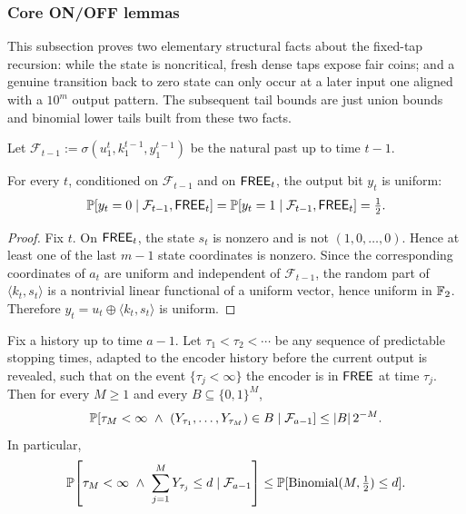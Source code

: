 \subsubsection{Core ON/OFF lemmas}
\label{subsec:inner-dense-onoff}

This subsection proves two elementary structural facts about the fixed-tap
recursion: while the state is noncritical, fresh dense taps expose fair coins;
and a genuine transition back to zero state can only occur at a later input one
aligned with a \(10^m\) output pattern.  The subsequent tail bounds are just
union bounds and binomial lower tails built from these two facts.

Let $\mathcal{F}_{t-1}:=\sigma(u_1^t,k_1^{t-1},y_1^{t-1})$ be the natural past up to time $t-1$.

\begin{lemma}
\label{lem:dense-fair-while-on}
For every $t$, conditioned on $\mathcal{F}_{t-1}$ and on $\mathsf{FREE}_t$, the output bit $y_t$ is uniform:
\[
\mathbb{P}[y_t=0\mid \mathcal{F}_{t-1},\mathsf{FREE}_t]=\mathbb{P}[y_t=1\mid \mathcal{F}_{t-1},\mathsf{FREE}_t]=\tfrac12.
\]
\end{lemma}

\begin{proof}
Fix $t$. On $\mathsf{FREE}_t$, the state \(s_t\) is nonzero and is not \((1,0,\dots,0)\). Hence at least one of the last
\(m-1\) state coordinates is nonzero. Since the corresponding coordinates of \(a_t\) are uniform and independent of
\(\mathcal{F}_{t-1}\), the random part of \(\langle k_t,s_t\rangle\) is a nontrivial linear functional of a uniform
vector, hence uniform in \(\mathbb{F}_2\). Therefore \(y_t=u_t\oplus\langle k_t,s_t\rangle\) is uniform.
\end{proof}

\begin{lemma}
\label{lem:dense-on-time-domination}
Fix a history up to time \(a-1\). Let
\(\tau_1<\tau_2<\cdots\) be any sequence of predictable stopping times, adapted to the encoder history before the
current output is revealed, such that on the event \(\{\tau_j<\infty\}\) the encoder is in \(\mathsf{FREE}\) at time
\(\tau_j\). Then
for every \(M\ge 1\) and every \(B\subseteq\{0,1\}^M\),
\[
\mathbb{P}\!\left[
\tau_M<\infty\ \wedge\ (Y_{\tau_1},\dots,Y_{\tau_M})\in B
\mid \mathcal{F}_{a-1}
\right]
\le
|B|\,2^{-M}.
\]
In particular,
\[
\mathbb{P}\!\left[
\tau_M<\infty\ \wedge\ \sum_{j=1}^M Y_{\tau_j}\le d
\mid \mathcal{F}_{a-1}
\right]
\le
\mathbb{P}[\operatorname{Binomial}(M,\tfrac12)\le d].
\]
\end{lemma}

